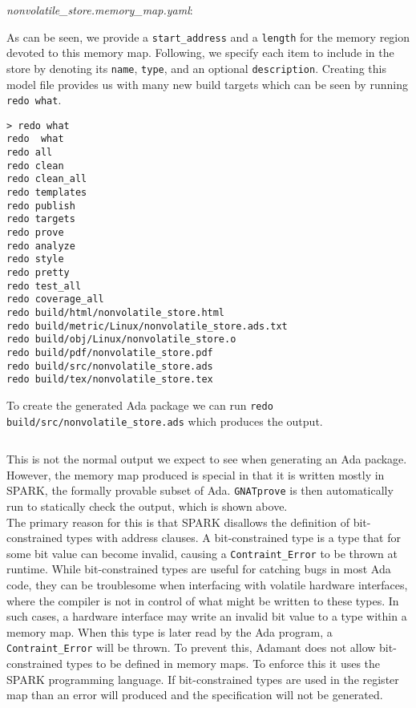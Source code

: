 \textit{nonvolatile\_store.memory\_map.yaml}:

As can be seen, we provide a \texttt{start\_address} and a \texttt{length} for the memory region devoted to this memory map. Following, we specify each item to include in the store by denoting its \texttt{name}, \texttt{type}, and an optional \texttt{description}. Creating this model file provides us with many new build targets which can be seen by running \texttt{redo what}.

\vspace{5mm} %
\begin{verbatim}
> redo what
redo  what
redo all
redo clean
redo clean_all
redo templates
redo publish
redo targets
redo prove
redo analyze
redo style
redo pretty
redo test_all
redo coverage_all
redo build/html/nonvolatile_store.html
redo build/metric/Linux/nonvolatile_store.ads.txt
redo build/obj/Linux/nonvolatile_store.o
redo build/pdf/nonvolatile_store.pdf
redo build/src/nonvolatile_store.ads
redo build/tex/nonvolatile_store.tex
\end{verbatim}
\vspace{5mm} %

To create the generated Ada package we can run \texttt{redo build/src/nonvolatile\_store.ads} which produces the output.

\vspace{5mm} %
\inputminted{text}{../example_architecture/memory_map/output.txt}
\vspace{5mm} %

This is not the normal output we expect to see when generating an Ada package. However, the memory map produced is special in that it is written mostly in SPARK, the formally provable subset of Ada. \texttt{GNATprove} is then automatically run to statically check the output, which is shown above. \\

The primary reason for this is that SPARK disallows the definition of bit-constrained types with address clauses. A bit-constrained type is a type that for some bit value can become invalid, causing a \texttt{Contraint\_Error} to be thrown at runtime. While bit-constrained types are useful for catching bugs in most Ada code, they can be troublesome when interfacing with volatile hardware interfaces, where the compiler is not in control of what might be written to these types. In such cases, a hardware interface may write an invalid bit value to a type within a memory map. When this type is later read by the Ada program, a \texttt{Contraint\_Error} will be thrown. To prevent this, Adamant does not allow bit-constrained types to be defined in memory maps. To enforce this it uses the SPARK programming language. If bit-constrained types are used in the register map than an error will produced and the specification will not be generated. \\


